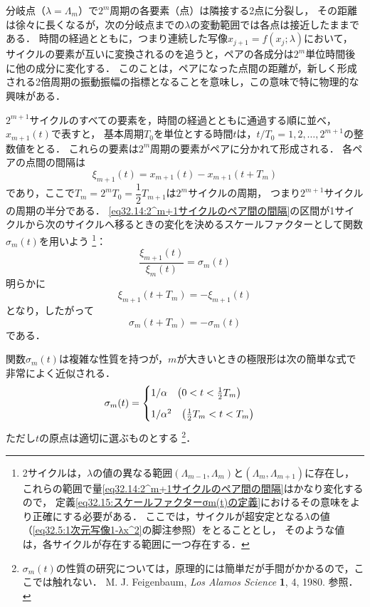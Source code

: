 分岐点（$\lambda=\Lambda_m$）で$2^m$周期の各要素（点）は隣接する2点に分裂し，
その距離は徐々に長くなるが，次の分岐点までの$\lambda$の変動範囲では各点は接近したままである．
時間の経過とともに，つまり連続した写像$x_{j+1}=f(x_j;\lambda)$において，
サイクルの要素が互いに変換されるのを追うと，ペアの各成分は$2^m$単位時間後に他の成分に変化する．
このことは，ペアになった点間の距離が，新しく形成される2倍周期の振動振幅の指標となることを意味し，この意味で特に物理的な興味がある．



$2^{m+1}$サイクルのすべての要素を，時間の経過とともに通過する順に並べ，$x_{m+1}(t)$で表すと，
基本周期$T_0$を単位とする時間$t$は，$t/T_0 = 1,2,\ldots,2^{m+1}$の整数値をとる．
これらの要素は$2^m$周期の要素がペアに分かれて形成される．
各ペアの点間の間隔は
\begin{equation}\label{eq32.14:2^m+1サイクルのペア間の間隔}
    \xi_{m+1}(t) = x_{m+1}(t) - x_{m+1}(t+T_m)
\end{equation}
であり，ここで$T_m=2^mT_0=\dfrac{1}{2}T_{m+1}$は$2^m$サイクルの周期，
つまり$2^{m+1}$サイクルの周期の半分である．
\eqref{eq32.14:2^m+1サイクルのペア間の間隔}の区間が1サイクルから次のサイクルへ移るときの変化を決めるスケールファクターとして関数$\sigma_m(t)$を用いよう
\footnote{
2サイクルは，$\lambda$の値の異なる範囲$(\Lambda_{m-1},\Lambda_m)$と$(\Lambda_m,\Lambda_{m+1})$に存在し，
これらの範囲で量\eqref{eq32.14:2^m+1サイクルのペア間の間隔}はかなり変化するので，
定義\eqref{eq32.15:スケールファクターσm(t)の定義}におけるその意味をより正確にする必要がある．
ここでは，サイクルが超安定となる$\lambda$の値（\eqref{eq32.5:1次元写像1-λx^2}の脚注参照）をとることとし，
そのような値は，各サイクルが存在する範囲に一つ存在する．}：
\begin{equation}\label{eq32.15:スケールファクターσm(t)の定義}
    \frac{\xi_{m+1}(t)}{\xi_m(t)} = \sigma_m(t)
\end{equation}
明らかに
\begin{equation}
    \xi_{m+1}(t+T_m) = -\xi_{m+1}(t)
\end{equation}
となり，したがって
\begin{equation}
    \sigma_m(t+T_m) = -\sigma_m(t)
\end{equation}
である．



関数$\sigma_m(t)$は複雑な性質を持つが，$m$が大きいときの極限形は次の簡単な式で非常によく近似される．
\begin{equation}
    \sigma_m(t) = 
    \begin{cases}
        1/\alpha \quad \pqty{ 0<t<\frac{1}{2}T_m } \\[7pt]
        1/\alpha^2 \quad \pqty{ \frac{1}{2}T_m<t<T_m }
    \end{cases}
\end{equation}
ただし$t$の原点は適切に選ぶものとする
\footnote{
$\sigma_m(t)$の性質の研究については，原理的には簡単だが手間がかかるので，ここでは触れない．
M. J. Feigenbaum, \textit{Los Alamos Science} \textbf{1}, 4, 1980.
参照．}．



